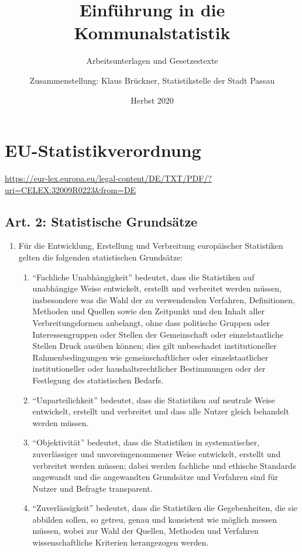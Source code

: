 \documentclass[A4, 12pt]{scrbook}
\title{Einführung in die Kommunalstatistik}
\subtitle{Arbeitsunterlagen und Gesetzestexte}
\author{Zusammenstellung: Klaus Brückner, Statistikstelle der Stadt Passau}
\date{Herbst 2020}
\begin{document}
\maketitle
\tableofcontents

\chapter[EU-StatV]{EU-Statistikverordnung}
\newline
\url{https://eur-lex.europa.eu/legal-content/DE/TXT/PDF/?uri=CELEX:32009R0223&from=DE}
    \section{Art. 2: Statistische Grundsätze}
        \begin{enumerate}[label=(\arabic*)]
            \item Für die Entwicklung, Erstellung und Verbreitung europäischer Statistiken gelten die folgenden statistischen Grundsätze:
            \begin{enumerate}
                \item ``Fachliche Unabhängigkeit'' bedeutet, dass die Statistiken auf unabhängige Weise entwickelt, erstellt und verbreitet werden müssen, insbesondere was die Wahl der zu verwendenden Verfahren, Definitionen, Methoden und Quellen sowie den Zeitpunkt und den Inhalt aller Verbreitungsformen anbelangt, ohne dass politische Gruppen oder Interessengruppen oder Stellen der Gemeinschaft oder einzelstaatliche Stellen Druck ausüben können; dies gilt unbeschadet institutioneller Rahmenbedingungen wie gemeinschaftlicher oder einzelstaatlicher institutioneller oder haushaltsrechtlicher Bestimmungen oder der Festlegung des statistischen Bedarfs.
                \item ``Unparteilichkeit'' bedeutet, dass die Statistiken auf neutrale Weise entwickelt, erstellt und verbreitet und dass alle Nutzer gleich behandelt werden müssen.
                \item ``Objektivität'' bedeutet, dass die Statistiken in systematischer, zuverlässiger und unvoreingenommener Weise entwickelt, erstellt und verbreitet werden müssen; dabei werden fachliche und ethische Standards angewandt und die angewandten Grundsätze und Verfahren sind für Nutzer und Befragte transparent.
                \item ``Zuverlässigkeit'' bedeutet, dass die Statistiken die Gegebenheiten, die sie abbilden sollen, so getreu, genau und konsistent wie möglich messen müssen, wobei zur Wahl der Quellen, Methoden und Verfahren wissenschaftliche Kriterien herangezogen werden.

\end{enumerate}
\end{enumerate}
\end{document}
